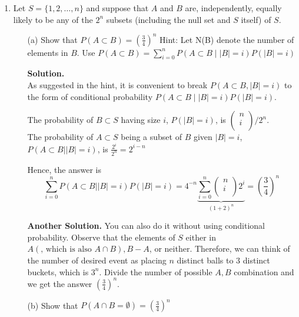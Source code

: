 \documentclass[12pt]{article}
\begin{document}
\begin{enumerate}
\item
Let \(S = \{1,2,\dots, n\}\)  and suppose that \(A\) and \(B\) are, independently,
equally likely to be any of the \(2^n\) subsets (including the null set and \(S\) itself) of \(S\).

\begin{itemize}
    \item[(a)] Show that $ P(A \subset B) = (\frac{3}{4})^n$
    Hint: Let N(B) denote the number of elements in \(B\).
    Use $P (A \subset B )= \sum_{i=0}^{n} P(A \subset B \mid  |B| = i)P( |B| = i)$

    \textbf{Solution.}\\
    As suggested in the hint, it is convenient to break \(P(A \subset B, |B| = i)\) to the form of conditional probability \(P(A \subset B \mid  |B| = i)P( |B| = i) \). 
    
    The probability of \(B \subset S\) having size \(i\),   \(P(|B| = i )\),  is \(\begin{pmatrix}
         n \\
          i\\
    \end{pmatrix} / 2^n\). \\
    
    The probability of \(A \subset S\) being a subset of \(B\) given \(|B| = i\), \(P(A \subset B | |B| = i)\), is \(\frac{2^i}{2^n} = 2^{i-n}\)
    
    Hence, the answer is 
    \[
        \sum_{i=0}^{n} P(A \subset B | |B| = i) P(|B| = i) = 4^{-n} \underbrace{\sum_{i=0}^{n}\begin{pmatrix}
             n \\
             i \\
        \end{pmatrix}2^i}_{(1+2)^n} = (\frac{3}{4})^n 
    \]
    
    \textbf{Another Solution.}
    You can also do it without using conditional probability. Observe that the elements of \(S\) either in \(A (\text{, which is also } A \cap B), B-A \), or neither.   
    Therefore, we can think of the number of desired event as placing \(n\) distinct balls to 3 distinct buckets, which is \(3^n\). 
    Divide the number of possible \(A, B\) combination and we get the answer \((\frac{3}{4})^n\).    
    \item[(b)] Show that $P(A \cap B  = \emptyset) = (\frac{3}{4})^n$
    

\end{itemize}
\end{enumerate}
\end{document}
